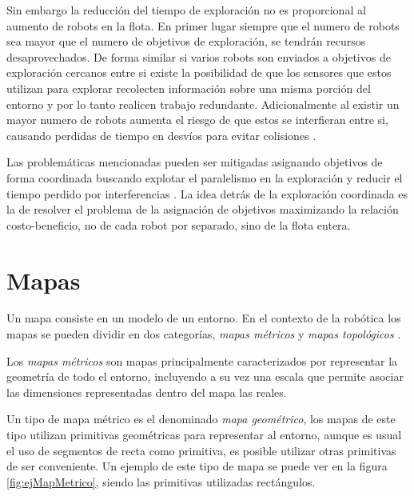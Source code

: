 Sin embargo la reducción del tiempo de exploración no es proporcional al
aumento de robots en la flota. En primer lugar siempre que el numero de robots
sea mayor que el numero de objetivos de exploración, se tendrán recursos
desaprovechados. De forma similar si varios robots son enviados a objetivos de
exploración cercanos entre si existe la posibilidad de que los sensores que
estos utilizan para explorar recolecten información sobre una misma porción del
entorno y por lo tanto realicen trabajo redundante. Adicionalmente al existir
un mayor numero de robots aumenta el riesgo de que estos se interfieran entre
si, causando perdidas de tiempo en desvíos para evitar colisiones
\cite{guzzoni1997many,goldberg1997interference}. 

Las problemáticas mencionadas pueden ser mitigadas asignando objetivos de forma
coordinada buscando explotar el paralelismo en la exploración y reducir el
tiempo perdido por interferencias \cite{nieto2014coordination}. La idea detrás
de la exploración coordinada es la de resolver el problema de la asignación de
objetivos maximizando la relación costo-beneficio, no de cada robot por separado,
sino de la flota entera.




\section{Mapas}\label{subsec:mapas} %
Un mapa consiste en un modelo de un entorno. En el contexto de la robótica los mapas se pueden dividir en dos categorías, \emph{mapas métricos} y \emph{mapas topológicos} \cite{Thrun1998,choset2005principles}.

Los \emph{mapas métricos} son mapas principalmente caracterizados por representar la geometría de todo el entorno, incluyendo a su vez una escala que permite asociar las dimensiones representadas dentro del mapa las reales.

Un tipo de mapa métrico es el denominado \emph{mapa geométrico}, los mapas de este tipo utilizan primitivas geométricas para representar al entorno, aunque es usual el uso de segmentos de recta como primitiva, es posible utilizar otras primitivas de ser conveniente. Un ejemplo de este tipo de mapa se puede ver en la figura \ref{fig:ejMapMetrico}, siendo las primitivas utilizadas rectángulos.

